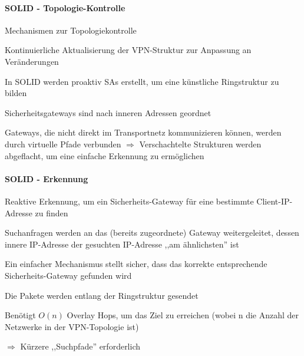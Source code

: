 \documentclass[a4paper]{article}
\begin{document}
\begin{multicols}{3}
      \paragraph{SOLID - Topologie-Kontrolle}
      \begin{itemize*}
            \item Mechanismen zur Topologiekontrolle
            \begin{itemize*}
                  \item Kontinuierliche Aktualisierung der VPN-Struktur zur Anpassung an Veränderungen
            \end{itemize*}
            \item In SOLID werden proaktiv SAs erstellt, um eine künstliche Ringstruktur zu bilden
            \item Sicherheitsgateways sind nach inneren Adressen geordnet
            \item Gateways, die nicht direkt im Transportnetz kommunizieren können, werden durch virtuelle Pfade verbunden $\Rightarrow$ Verschachtelte Strukturen werden abgeflacht, um eine einfache Erkennung zu ermöglichen
      \end{itemize*}

      \paragraph{SOLID - Erkennung}
      \begin{itemize*}
            \item Reaktive Erkennung, um ein Sicherheits-Gateway für eine bestimmte Client-IP-Adresse zu finden
            \item Suchanfragen werden an das (bereits zugeordnete) Gateway weitergeleitet, dessen innere IP-Adresse der gesuchten IP-Adresse ,,am ähnlichsten'' ist
            \begin{itemize*}
                  \item Ein einfacher Mechanismus stellt sicher, dass das korrekte entsprechende Sicherheits-Gateway gefunden wird
                  \item Die Pakete werden entlang der Ringstruktur gesendet
                  \item Benötigt $O(n)$ Overlay Hops, um das Ziel zu erreichen (wobei n die Anzahl der Netzwerke in der VPN-Topologie ist)
            \end{itemize*}
            \item $\Rightarrow$ Kürzere ,,Suchpfade'' erforderlich
      \end{itemize*}


\end{multicols}
\end{document}
